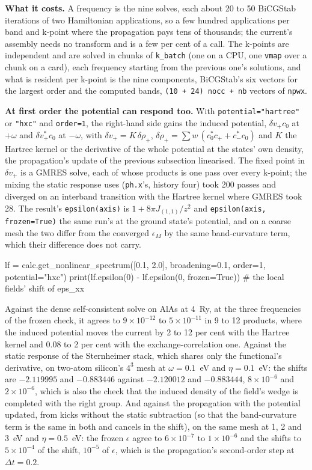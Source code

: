 \documentclass[11pt,a4paper]{article}
\newcommand{\code}[1]{\texttt{\small #1}}
\begin{document}
\textbf{What it costs.} A frequency is the nine solves, each about 20 to 50
BiCGStab iterations of two Hamiltonian applications, so a few hundred
applications per band and k-point where the propagation pays tens of thousands;
the current's assembly needs no transform and is a few per cent of a call. The
k-points are independent and are solved in chunks of \code{k\_batch} (one on a
CPU, one \code{vmap} over a chunk on a card), each frequency starting from the
previous one's solutions, and what is resident per k-point is the nine
components, BiCGStab's six vectors for the largest order and the computed bands,
\code{(10 + 24) nocc + nb} vectors of \code{npwx}.

\textbf{At first order the potential can respond too.} With
\code{potential="hartree"} or \code{"hxc"} and \code{order=1}, the right-hand side
gains the induced potential, $\delta v_+ c_0$ at $+\omega$ and $\delta v_+^* c_0$ at
$-\omega$, with $\delta v_+ = K\,\delta\rho_+$,
$\delta\rho_+ = \sum w\,(c_0^* c_+ + c_-^* c_0)$ and $K$ the Hartree kernel or the
derivative of the whole potential at the states' own density, the propagation's
update of the previous subsection linearised. The fixed point in $\delta v_+$ is a
GMRES solve, each of whose products is one pass over every k-point; the mixing
the static response uses (\code{ph.x}'s, history four) took 200 passes and
diverged on an interband transition with the Hartree kernel where GMRES took 28.
The result's \code{epsilon(axis)} is $1 + 8\pi J_{(1,1)}/z^2$ and
\code{epsilon(axis, frozen=True)} the same run's at the ground state's potential,
and on a coarse mesh the two differ from the converged $\epsilon_M$ by the same
band-curvature term, which their difference does not carry.

\begin{pycode}
lf = calc.get_nonlinear_spectrum([0.1, 2.0], broadening=0.1, order=1, potential="hxc")
print(lf.epsilon(0) - lf.epsilon(0, frozen=True))   # the local fields' shift of eps_xx
\end{pycode}

Against the dense self-consistent solve on AlAs at 4~Ry, at the three
frequencies of the frozen check, it agrees to $9\times10^{-12}$ to
$5\times10^{-11}$ in 9 to 12 products, where the induced potential moves the
current by 2 to 12 per cent with the Hartree kernel and 0.08 to 2 per cent with
the exchange-correlation one. Against the static response of the Sternheimer
stack, which shares only the functional's derivative, on two-atom silicon's
$4^3$ mesh at $\omega = 0.1$~eV and $\eta = 0.1$~eV: the shifts are $-2.119995$ and
$-0.883446$ against $-2.120012$ and $-0.883444$, $8\times10^{-6}$ and
$2\times10^{-6}$, which is also the check that the induced density of the field's
wedge is completed with the right group. And against the propagation with the
potential updated, from kicks without the static subtraction (so that the
band-curvature term is the same in both and cancels in the shift), on the same
mesh at 1, 2 and 3~eV and $\eta = 0.5$~eV: the frozen $\epsilon$ agree to
$6\times10^{-7}$ to $1\times10^{-6}$ and the shifts to $5\times10^{-4}$ of the shift,
$10^{-5}$ of $\epsilon$, which is the propagation's second-order step at
$\Delta t = 0.2$.
\end{document}
